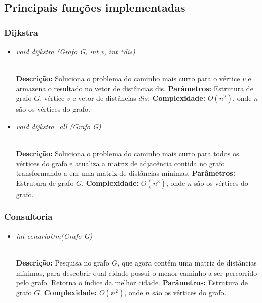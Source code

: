 \documentclass[12pt]{article}
\begin{document}
\subsection{Principais funções implementadas}

\subsubsection{Dijkstra}

\begin{itemize}
 \item \begin{large}\textit{void dijkstra (Grafo G, int v,  int *dis)}\end{large}\\
 \subitem \textbf{Descrição:} Soluciona o problema do caminho mais curto para o vértice $v$ e armazena o resultado no vetor de distâncias dis.
 \subitem \textbf{Parâmetros:} Estrutura de grafo $G$, vértice $v$ e vetor de distâncias $dis$.
 \subitem \textbf{Complexidade:} $O(n^2)$, onde $n$ são os vértices do grafo.
\end{itemize}

\vspace{0.2 true cm}

\begin{itemize}
 \item \begin{large}\textit{void dijkstra\_all (Grafo G)}\end{large}\\
 \subitem \textbf{Descrição:} Soluciona o problema do caminho mais curto para todos os vértices do grafo e atualiza a matriz de adjacência contida no grafo transformando-a em uma matriz de distâncias mínimas.
 \subitem \textbf{Parâmetros:} Estrutura de grafo $G$.
 \subitem \textbf{Complexidade:} $O(n^3)$, onde $n$ são os vértices do grafo.
\end{itemize}


\subsubsection{Consultoria}

\begin{itemize}
 \item \begin{large}\textit{int cenarioUm(Grafo G)}\end{large}\\
 \subitem \textbf{Descrição:} Pesquisa no grafo $G$, que agora contém uma matriz de distâncias mínimas, para descobrir qual cidade possui o menor caminho a ser percorrido pelo grafo. Retorna o índice da melhor cidade.
 \subitem \textbf{Parâmetros:} Estrutura de grafo $G$.
 \subitem \textbf{Complexidade:} $O(n^2)$, onde $n$ são os vértices do grafo.
\end{itemize}
\end{document}
